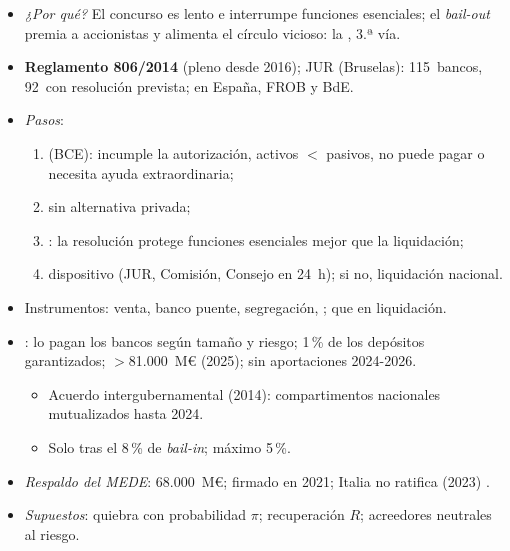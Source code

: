 \documentclass{article}
\begin{document}
\begin{columnas}
\begin{itemize}
\item \emph{¿Por qué?} El concurso es lento e interrumpe funciones esenciales; el \emph{bail-out} premia a accionistas y alimenta el círculo vicioso: la , 3.ª vía.
\item \textbf{Reglamento 806/2014} (pleno desde 2016); JUR (Bruselas): 115~bancos, 92~con resolución prevista; en España, FROB y BdE.
\item \emph{Pasos}:
  \begin{enumerate}
  \item {} (BCE): incumple la autorización, activos $<$ pasivos, no puede pagar o necesita ayuda extraordinaria;
  \item sin alternativa privada;
  \item {}: la resolución protege funciones esenciales mejor que la liquidación;
  \item dispositivo (JUR, Comisión, Consejo en 24~h); si no, liquidación nacional.
  \end{enumerate}
\item Instrumentos: venta, banco puente, segregación, ;  que en liquidación.
\item {}: lo pagan los bancos según tamaño y riesgo; 1\,\% de los depósitos garantizados; $>$81.000~M€ (2025); sin aportaciones 2024-2026.
  \begin{itemize}
  \item Acuerdo intergubernamental (2014): compartimentos nacionales mutualizados hasta 2024.
  \end{itemize}
  \begin{itemize}
  \item Solo tras el 8\,\% de \emph{bail-in}; máximo 5\,\%.
  \end{itemize}
\item \emph{Respaldo del MEDE}: 68.000~M€; firmado en 2021; Italia no ratifica (2023) .
\end{itemize}
\begin{itemize}
\item \emph{Supuestos}: quiebra con probabilidad $\pi$; recuperación $R$; acreedores neutrales al riesgo.

\end{itemize}
\end{columnas}
\end{document}

